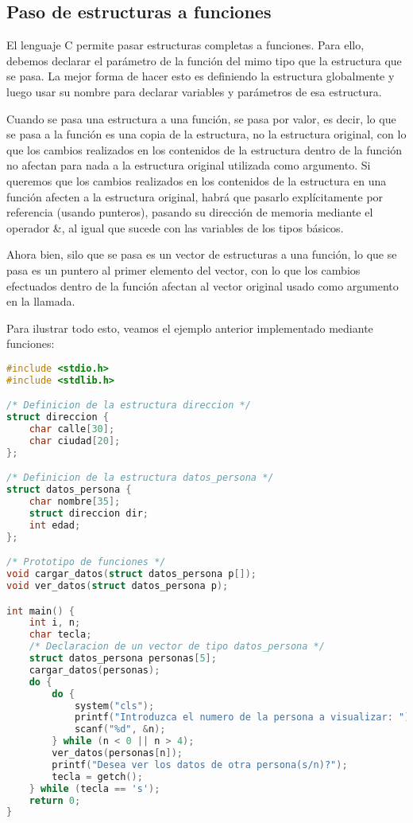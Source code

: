 \subsection{Paso de estructuras a funciones}{
El lenguaje C permite pasar estructuras completas a funciones. Para ello, debemos declarar el parámetro de la función del mimo tipo que la estructura que se pasa. La mejor forma de hacer esto es definiendo la estructura globalmente y luego usar su nombre para declarar variables y parámetros de esa estructura.

Cuando se pasa una estructura a una función, se pasa por valor, es decir, lo que se pasa a la función es una copia de la estructura, no la estructura original, con lo que los cambios realizados en los contenidos de la estructura dentro de la función no afectan para nada a la estructura original utilizada como argumento. Si queremos que los cambios realizados en los contenidos de la estructura en una función afecten a la estructura original, habrá que pasarlo explícitamente por referencia (usando punteros), pasando su dirección de memoria mediante el operador \&, al igual que sucede con las variables de los tipos básicos.

Ahora bien, silo que se pasa es un vector de estructuras a una función, lo que se pasa es un puntero al primer elemento del vector, con lo que los cambios efectuados dentro de la función afectan al vector original usado como argumento en la llamada.

Para ilustrar todo esto, veamos el ejemplo anterior implementado mediante funciones:
\begin{Ejemplo}
\begin{lstlisting}[language=C]
#include <stdio.h>
#include <stdlib.h>

/* Definicion de la estructura direccion */
struct direccion {
    char calle[30];
    char ciudad[20];
};

/* Definicion de la estructura datos_persona */
struct datos_persona {
    char nombre[35];
    struct direccion dir;
    int edad;
};

/* Prototipo de funciones */
void cargar_datos(struct datos_persona p[]);
void ver_datos(struct datos_persona p);

int main() {
    int i, n;
    char tecla;
    /* Declaracion de un vector de tipo datos_persona */
    struct datos_persona personas[5];
    cargar_datos(personas);
    do {
        do {
            system("cls");
            printf("Introduzca el numero de la persona a visualizar: ");
            scanf("%d", &n);
        } while (n < 0 || n > 4);
        ver_datos(personas[n]);
        printf("Desea ver los datos de otra persona(s/n)?");
        tecla = getch();
    } while (tecla == 's');
    return 0;
}


\end{lstlisting}
\end{Ejemplo}}
